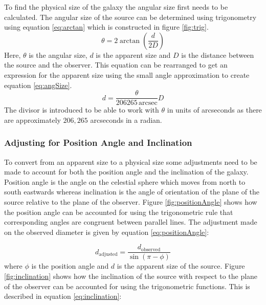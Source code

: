 \documentclass[%
reprint,
amsmath,amssymb,
aps,
]{revtex4-2}
\begin{document}
					To find the physical size of the galaxy the angular size first needs to be calculated. The angular size of the source can be determined using trigonometry using equation \ref{eq:arctan} which is constructed in figure \ref{fig:trig}.
					\begin{equation}
						\theta = 2 \arctan{\left(\frac{d}{2 D}\right)}
						\label{eq:arctan}
					\end{equation}Here, $\theta$ is the angular size, $d$ is the apparent size and $D$ is the distance between the source and the observer. This equation can be rearranged to get an expression for the apparent size using the small angle approximation to create equation \ref{eq:angSize}.
					\begin{equation}
						d = \frac{\theta}{206265\,\text{arcsec}} D
						\label{eq:angSize}
					\end{equation}The divisor is introduced to be able to work with $\theta$ in units of arcseconds as there are approximately $206,265$ arcseconds in a radian\cite{modernAstro}.
				
		
			\subsubsection{\label{sec:paAndI}Adjusting for Position Angle and Inclination}
				To convert from an apparent size to a physical size some adjustments need to be made to account for both the position angle and the inclination of the galaxy. Position angle is the angle on the celestial sphere which moves from north to south eastwards whereas inclination is the angle of orientation of the plane of the source relative to the plane of the observer. Figure \ref{fig:positionAngle} shows how the position angle can be accounted for using the trigonometric rule that corresponding angles are congruent between parallel lines. The adjustment made on the observed diameter is given by equation \ref{eq:positionAngle}:
				
				\begin{equation}
					d_\text{adjusted} = \frac{d_\text{observed}}{\sin{\left(\pi - \phi\right)}}
					\label{eq:positionAngle}
				\end{equation}where $\phi$ is the position angle and $d$ is the apparent size of the source. Figure \ref{fig:inclination} shows how the inclination of the source with respect to the plane of the observer can be accounted for using the trigonometric functions. This is described in equation \ref{eq:inclination}:
			
\end{document}
